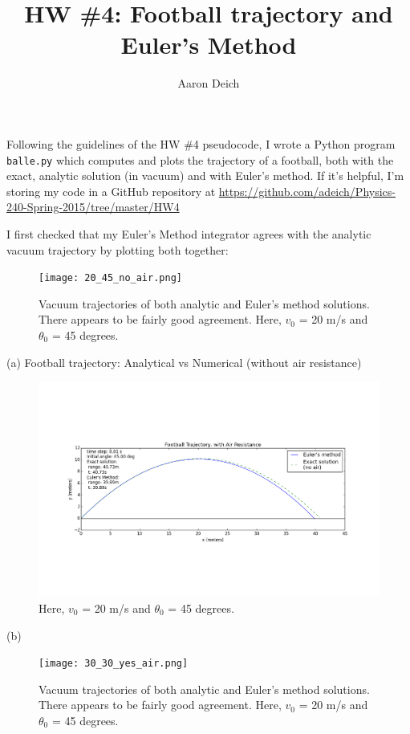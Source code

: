 \documentclass{article}
\begin{document}
\title{HW \#4: Football trajectory and Euler's Method}
\author{Aaron Deich}

\maketitle

Following the guidelines of the HW \#4 pseudocode, I wrote a Python program \texttt{balle.py} which computes and plots the trajectory of a football, both with the exact, analytic solution (in vacuum) and with Euler's method. If it's helpful, I'm storing my code in a GitHub repository at \url{https://github.com/adeich/Physics-240-Spring-2015/tree/master/HW4}

I first checked that my Euler's Method integrator agrees with the analytic vacuum trajectory by plotting both together:

\begin{figure}[h!]
  \caption{Vacuum trajectories of both analytic and Euler's method solutions. There appears to be fairly good agreement. Here, $v_0$ = 20 m/s and $\theta_0$ = 45 degrees.}
  \centering
    \texttt{[image: 20\_45\_no\_air.png]}
\end{figure}


(a) Football trajectory: Analytical vs Numerical (without air resistance)

\begin{figure}[h!]
  \caption{Here, $v_0$ = 20 m/s and $\theta_0$ = 45 degrees.}
  \centering
    \includegraphics[width=1.1\textwidth]{20_45_yes_air.png}
\end{figure}

(b) 

\begin{figure}[h!]
  \caption{Vacuum trajectories of both analytic and Euler's method solutions. There appears to be fairly good agreement. Here, $v_0$ = 20 m/s and $\theta_0$ = 45 degrees.}
  \centering
    \texttt{[image: 30\_30\_yes\_air.png]}
\end{figure}
\end{document}

